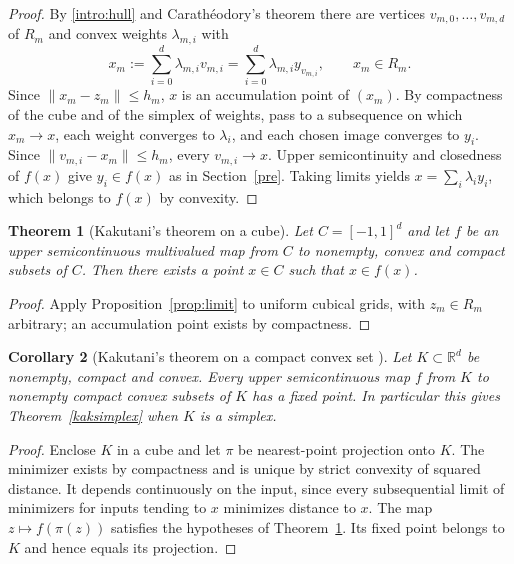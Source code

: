 \documentclass[11pt]{amsart}
\newtheorem{thm}{Theorem}[section]
\newtheorem{cor}[thm]{Corollary}
\theoremstyle{definition}
\theoremstyle{remark}
\numberwithin{equation}{section}
\newcommand{\R}{\mathbb R}
\begin{document}
\begin{proof}
By \eqref{intro:hull} and Carath\'eodory's theorem there are vertices $v_{m,0},\ldots,v_{m,d}$ of $R_m$ and convex weights $\lambda_{m,i}$ with
\[
  x_m:=\sum_{i=0}^d\lambda_{m,i}v_{m,i}
      =\sum_{i=0}^d\lambda_{m,i}y_{v_{m,i}},\qquad x_m\in R_m .
\]
Since $\|x_m-z_m\|\le h_m$, $x$ is an accumulation point of $(x_m)$. By compactness of the cube and of the simplex of weights, pass to a subsequence on which $x_m\to x$, each weight converges to $\lambda_i$, and each chosen image converges to $y_i$. Since $\|v_{m,i}-x_m\|\le h_m$, every $v_{m,i}\to x$. Upper semicontinuity and closedness of $f(x)$ give $y_i\in f(x)$ as in Section~\ref{pre}. Taking limits yields $x=\sum_i\lambda_i y_i$, which belongs to $f(x)$ by convexity.
\end{proof}

\begin{thm}[Kakutani's theorem on a cube]\label{5}
Let $C=[-1,1]^d$ and let $f$ be an upper semicontinuous multivalued map from $C$ to nonempty, convex and compact subsets of $C$. Then there exists a point $x\in C$ such that $x\in f(x)$.
\end{thm}

\begin{proof}
Apply Proposition~\ref{prop:limit} to uniform cubical grids, with $z_m\in R_m$ arbitrary; an accumulation point exists by compactness.
\end{proof}

\begin{cor}[Kakutani's theorem on a compact convex set {\cite[Corollary]{KF}}]\label{compactconvex}
Let $K\subset\R^d$ be nonempty, compact and convex. Every upper semicontinuous map $f$ from $K$ to nonempty compact convex subsets of $K$ has a fixed point. In particular this gives Theorem~\ref{kaksimplex} when $K$ is a simplex.
\end{cor}
\begin{proof}
Enclose $K$ in a cube and let $\pi$ be nearest-point projection onto $K$. The minimizer exists by compactness and is unique by strict convexity of squared distance. It depends continuously on the input, since every subsequential limit of minimizers for inputs tending to $x$ minimizes distance to $x$. The map $z\mapsto f(\pi(z))$ satisfies the hypotheses of Theorem~\ref{5}. Its fixed point belongs to $K$ and hence equals its projection.
\end{proof}
\end{document}
